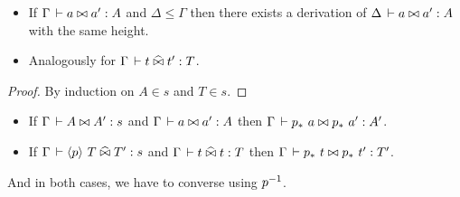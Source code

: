 \documentclass[a4paper,english]{lipics-utf8x}
\begin{document}
  \begin{lemma}[Weakening]
    \leavevmode
    \begin{itemize}
      \item If $\Gamma \,\vdash a \mathrel{\bowtie} a' : A$ and $\Delta \le \Gamma$ then there
      exists a derivation of $\Delta \,\vdash a \mathrel{\bowtie} a' : A$ with the same height.
      \item Analogously for $\Gamma \,\vdash t \mathrel{\widehat{\bowtie}} t' : T$.
    \end{itemize}
  \end{lemma}
  \begin{proof}
    By induction on $A \in s$ and $T \in s$.
  \end{proof}

  \begin{lemma}
    \label{lem:s-conv}
    \leavevmode
    \begin{itemize}
      \item If $\Gamma \,\vdash A \mathrel{\bowtie} A' : s$ and
      $\Gamma \,\vdash a \mathrel{\bowtie} a' : A$ then $\Gamma \,\vdash p_*\ a \mathrel{\bowtie} p_*\ a' : A'$.
      \item If $\Gamma \,\vdash \langle p \rangle~ T \mathrel{\widehat{\bowtie}} T' : s$ and
      $\Gamma \,\vdash t \mathrel{\widehat{\bowtie}} t : T$ then $\Gamma \,\vdash p_*\ t \mathrel{\bowtie} p_*\ t' : T'$.
    \end{itemize}
    And in both cases, we have to converse using $p^{-1}$.
  \end{lemma}
\end{document}
